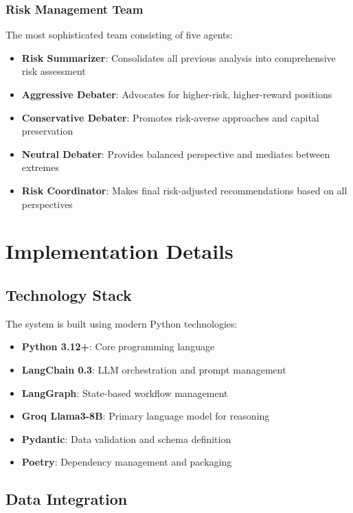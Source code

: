 \documentclass[11pt,a4paper]{article}
\begin{document}
\subsubsection{Risk Management Team}
The most sophisticated team consisting of five agents:

\begin{itemize}
    \item \textbf{Risk Summarizer}: Consolidates all previous analysis into comprehensive risk assessment
    \item \textbf{Aggressive Debater}: Advocates for higher-risk, higher-reward positions
    \item \textbf{Conservative Debater}: Promotes risk-averse approaches and capital preservation
    \item \textbf{Neutral Debater}: Provides balanced perspective and mediates between extremes
    \item \textbf{Risk Coordinator}: Makes final risk-adjusted recommendations based on all perspectives
\end{itemize}

\section{Implementation Details}

\subsection{Technology Stack}

The system is built using modern Python technologies:

\begin{itemize}
    \item \textbf{Python 3.12+}: Core programming language
    \item \textbf{LangChain 0.3}: LLM orchestration and prompt management
    \item \textbf{LangGraph}: State-based workflow management
    \item \textbf{Groq Llama3-8B}: Primary language model for reasoning
    \item \textbf{Pydantic}: Data validation and schema definition
    \item \textbf{Poetry}: Dependency management and packaging
\end{itemize}

\subsection{Data Integration}
\end{document}
